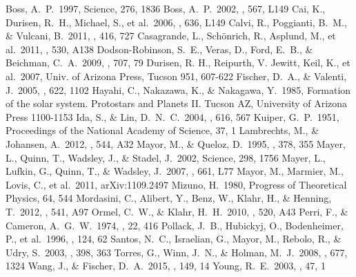 \documentclass[twocolumn, dvipdfmx]{aastex62}
\begin{document}
\begin{CJK*}{UTF8}{min}
\begin{thebibliography}{}

 Boss, A.~P.\ 1997, Science, 276, 1836
 Boss, A.~P.\ 2002, \apjl, 567, L149
 Cai, K., Durisen, R.~H., Michael, S., et al.\ 2006, \apjl, 636, L149
 Calvi, R., Poggianti, B.~M., \& Vulcani, B.\ 2011, \mnras, 416, 727
 Casagrande, L., Sch{\"o}nrich, R., Asplund, M., et al.\ 2011, \aap, 530, A138
 Dodson-Robinson, S.~E., Veras, D., Ford, E.~B., \& Beichman, C.~A.\ 2009, \apj, 707, 79
 Durisen, R. H., Reipurth, V. Jewitt, Keil, K., et al.\ 2007, Univ. of Arizona Press, Tucson 951, 607-622
 Fischer, D.~A., \& Valenti, J.\ 2005, \apj, 622, 1102
 Hayahi, C., Nakazawa, K., \& Nakagawa, Y.\ 1985, Formation of the solar system. Protostars and Planets II. Tucson AZ, University of Arizona Press 1100-1153
 Ida, S., \& Lin, D.~N.~C.\ 2004, \apj, 616, 567
 Kuiper, G.~P.\ 1951, Proceedings of the National Academy of Science, 37, 1
 Lambrechts, M., \& Johansen, A.\ 2012, \aap, 544, A32
 Mayor, M., \& Queloz, D.\ 1995, \nat, 378, 355
 Mayer, L., Quinn, T., Wadsley, J., \& Stadel, J.\ 2002, Science, 298, 1756
 Mayer, L., Lufkin, G., Quinn, T., \& Wadsley, J.\ 2007, \apjl, 661, L77
 Mayor, M., Marmier, M., Lovis, C., et al.\ 2011, arXiv:1109.2497
 Mizuno, H.\ 1980, Progress of Theoretical Physics, 64, 544
 Mordasini, C., Alibert, Y., Benz, W., Klahr, H., \& Henning, T.\ 2012, \aap, 541, A97
 Ormel, C.~W., \& Klahr, H.~H.\ 2010, \aap, 520, A43
 Perri, F., \& Cameron, A.~G.~W.\ 1974, \icarus, 22, 416
 Pollack, J.~B., Hubickyj, O., Bodenheimer, P., et al.\ 1996, \icarus, 124, 62
 Santos, N.~C., Israelian, G., Mayor, M., Rebolo, R., \& Udry, S.\ 2003, \aap, 398, 363
 Torres, G., Winn, J.~N., \& Holman, M.~J.\ 2008, \apj, 677, 1324
 Wang, J., \& Fischer, D.~A.\ 2015, \aj, 149, 14
 Young, R.~E.\ 2003, \nar, 47, 1

\end{thebibliography}

\appendix

\end{CJK*}
\end{document}
